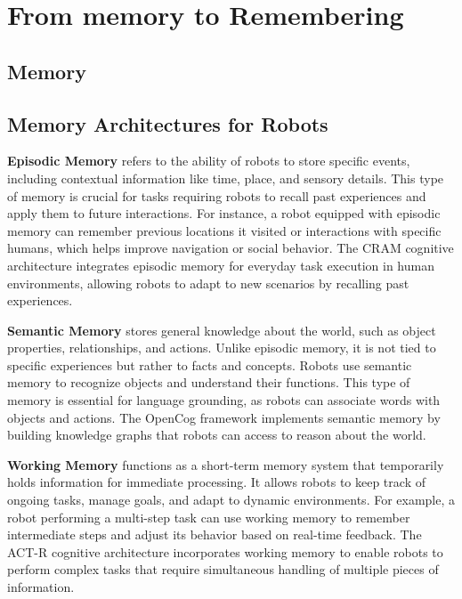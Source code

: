 \chapter{From memory to Remembering}

\section{Memory}

    \section{Memory Architectures for Robots}
        \textbf{Episodic Memory} refers to the ability of robots to store specific events, including contextual information like time, place, and sensory details. This type of memory is crucial for tasks requiring robots to recall past experiences and apply them to future interactions. For instance, a robot equipped with episodic memory can remember previous locations it visited or interactions with specific humans, which helps improve navigation or social behavior. The CRAM cognitive architecture integrates episodic memory for everyday task execution in human environments, allowing robots to adapt to new scenarios by recalling past experiences. \cite{beetz-2015-cram-cognitive-robot-abstract-machine}
        
        \textbf{Semantic Memory} stores general knowledge about the world, such as object properties, relationships, and actions. Unlike episodic memory, it is not tied to specific experiences but rather to facts and concepts. Robots use semantic memory to recognize objects and understand their functions. This type of memory is essential for language grounding, as robots can associate words with objects and actions. The OpenCog framework implements semantic memory by building knowledge graphs that robots can access to reason about the world. \cite{goertzel-2014-opencog-framework-artificial-general-intelligence}
        
        \textbf{Working Memory} functions as a short-term memory system that temporarily holds information for immediate processing. It allows robots to keep track of ongoing tasks, manage goals, and adapt to dynamic environments. For example, a robot performing a multi-step task can use working memory to remember intermediate steps and adjust its behavior based on real-time feedback. The ACT-R cognitive architecture incorporates working memory to enable robots to perform complex tasks that require simultaneous handling of multiple pieces of information. \cite{anderson-2004-integrated-theory-of-mind}
        
